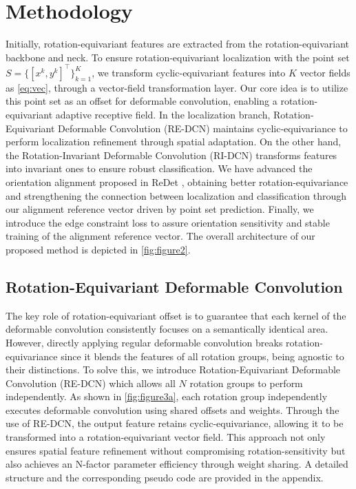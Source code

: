 \documentclass[letterpaper]{article} %
\begin{document}
\section{Methodology}
Initially, rotation-equivariant features are extracted from the rotation-equivariant backbone and neck. To ensure rotation-equivariant localization with the point set \( S = \{[x^k, y^k]^\top\}_{k=1}^K \), we transform cyclic-equivariant features into \(K\) vector fields as \cref{eq:vec}, through a vector-field transformation layer. Our core idea is to utilize this point set as an offset for deformable convolution, enabling a rotation-equivariant adaptive receptive field. In the localization branch, Rotation-Equivariant Deformable Convolution (RE-DCN) maintains cyclic-equivariance to perform localization refinement through spatial adaptation. On the other hand, the Rotation-Invariant Deformable Convolution (RI-DCN) transforms features into invariant ones to ensure robust classification. We have advanced the orientation alignment proposed in ReDet \citep{han2021ReDet}, obtaining better rotation-equivariance and strengthening the connection between localization and classification through our alignment reference vector driven by point set prediction. Finally, we introduce the edge constraint loss to assure orientation sensitivity and stable training of the alignment reference vector. The overall architecture of our proposed method is depicted in \cref{fig:figure2}. 

\subsection{Rotation-Equivariant Deformable Convolution} %
The key role of rotation-equivariant offset is to guarantee that each kernel of the deformable convolution consistently focuses on a semantically identical area. However, directly applying regular deformable convolution breaks rotation-equivariance since it blends the features of all rotation groups, being agnostic to their distinctions. To solve this, we introduce Rotation-Equivariant Deformable Convolution (RE-DCN) which allows all \(N\) rotation groups to perform independently. As shown in \cref{fig:figure3a}, each rotation group independently executes deformable convolution using shared offsets and weights. Through the use of RE-DCN, the output feature retains cyclic-equivariance, allowing it to be transformed into a rotation-equivariant vector field. This approach not only ensures spatial feature refinement without compromising rotation-sensitivity but also achieves an N-factor parameter efficiency through weight sharing. A detailed structure and the corresponding pseudo code are provided in the appendix.
\end{document}
